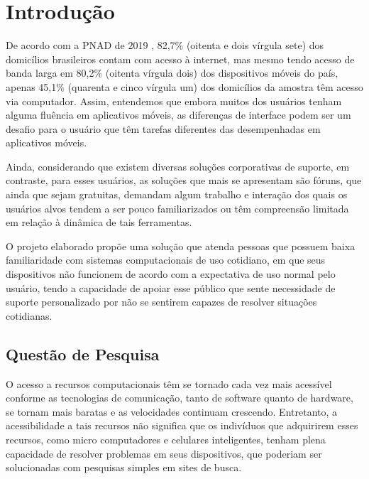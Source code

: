 
\chapter[Introdução]{Introdução}

	De acordo com a PNAD de 2019 \citeauthor{PNAD:2019}, 82,7\% (oitenta e dois vírgula sete) dos domicílios brasileiros contam com acesso à internet, mas mesmo tendo acesso de banda larga em 80,2\% (oitenta vírgula dois) dos dispositivos móveis do país, apenas 45,1\% (quarenta e cinco vírgula um) dos domicílios da amostra têm acesso via computador. Assim, entendemos que embora muitos dos usuários tenham alguma fluência em aplicativos móveis, as diferenças de interface podem ser um desafio para o usuário que têm tarefas diferentes das desempenhadas em aplicativos móveis.
	
	Ainda, considerando que existem diversas soluções corporativas de suporte, em contraste, para esses usuários, as soluções que mais se apresentam são fóruns, que ainda que sejam gratuitas, demandam algum trabalho e interação dos quais os usuários alvos tendem a ser pouco familiarizados ou têm compreensão limitada em relação à dinâmica de tais ferramentas.
		
	O projeto elaborado propõe uma solução que atenda pessoas que possuem baixa familiaridade com sistemas computacionais de uso cotidiano, em que seus dispositivos não funcionem de acordo com a expectativa de uso normal pelo usuário, tendo a capacidade de apoiar esse público que sente necessidade de suporte personalizado por não se sentirem capazes de resolver situações cotidianas.

	\section[Questão de Pesquisa]{Questão de Pesquisa}
	
		O acesso a recursos computacionais têm se tornado cada vez mais acessível conforme as tecnologias de comunicação, tanto de software quanto de hardware, se tornam mais baratas e as velocidades continuam crescendo. Entretanto, a acessibilidade a tais recursos não significa que os indivíduos que adquirirem esses recursos, como micro computadores e celulares inteligentes, tenham plena capacidade de resolver problemas em seus dispositivos, que poderiam ser solucionadas com pesquisas simples em sites de busca.
		

